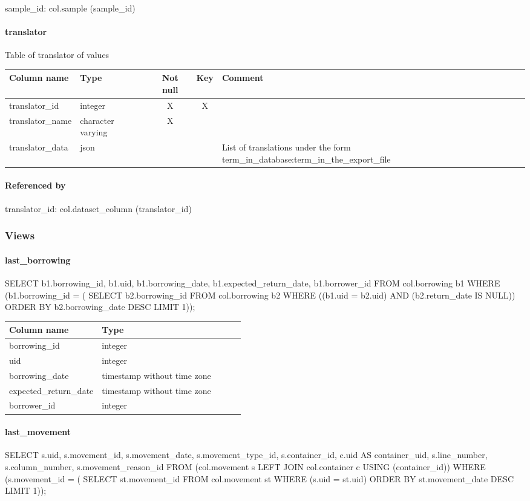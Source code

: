 sample\_id: col.sample (sample\_id)

\paragraph{translator}
Table of translator of values

\begin{tabular}{|l| p{2cm}|c|c| p{5cm}|}
\hline
Column name & Type & Not null & Key & Comment \\
\hline
translator\_id & integer & X & X & \\
translator\_name & character varying & X &  & \\
translator\_data & json &  &  & List of translations under the form term\_in\_database:term\_in\_the\_export\_file\\
\hline
\end{tabular}
\paragraph{Referenced by}
translator\_id: col.dataset\_column (translator\_id)

\subsubsection{Views}
\paragraph{last\_borrowing}

 SELECT b1.borrowing\_id,
    b1.uid,
    b1.borrowing\_date,
    b1.expected\_return\_date,
    b1.borrower\_id
   FROM col.borrowing b1
  WHERE (b1.borrowing\_id = ( SELECT b2.borrowing\_id
           FROM col.borrowing b2
          WHERE ((b1.uid = b2.uid) AND (b2.return\_date IS NULL))
          ORDER BY b2.borrowing\_date DESC
         LIMIT 1));

\begin{tabular}{|l| p{2cm}|c|c| p{5cm}|}
\hline
Column name & Type \\
\hline
borrowing\_id & integer\\
uid & integer\\
borrowing\_date & timestamp without time zone\\
expected\_return\_date & timestamp without time zone\\
borrower\_id & integer\\
\hline
\end{tabular}
\paragraph{last\_movement}
 SELECT s.uid,
    s.movement\_id,
    s.movement\_date,
    s.movement\_type\_id,
    s.container\_id,
    c.uid AS container\_uid,
    s.line\_number,
    s.column\_number,
    s.movement\_reason\_id
   FROM (col.movement s
     LEFT JOIN col.container c USING (container\_id))
  WHERE (s.movement\_id = ( SELECT st.movement\_id
           FROM col.movement st
          WHERE (s.uid = st.uid)
          ORDER BY st.movement\_date DESC
         LIMIT 1));

